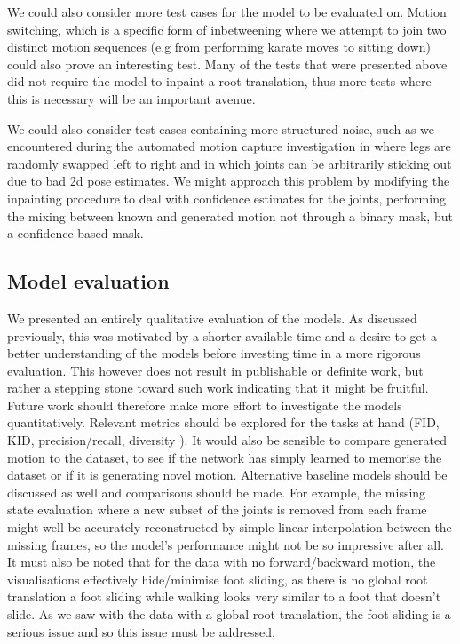We could also consider more test cases for the model to be evaluated on. Motion switching, which is a specific form of inbetweening where we attempt to join two distinct motion sequences (e.g from performing karate moves to sitting down) could also prove an interesting test. Many of the tests that were presented above did not require the model to inpaint a root translation, thus more tests where this is necessary will be an important avenue.

We could also consider test cases containing more structured noise, such as we encountered during the automated motion capture investigation in  where legs are randomly swapped left to right and in which joints can be arbitrarily sticking out due to bad 2d pose estimates. We might approach this problem by modifying the inpainting procedure to deal with confidence estimates for the joints, performing the mixing between known and generated motion not through a binary mask, but a confidence-based mask.

\subsection{Model evaluation}
\label{sec:future_work_evaluation}

We presented an entirely qualitative evaluation of the models. As discussed previously, this was motivated by a shorter available time and a desire to get a better understanding of the models before investing time in a more rigorous evaluation. This however does not result in publishable or definite work, but rather a stepping stone toward such work indicating that it might be fruitful. Future work should therefore make more effort to investigate the models quantitatively. Relevant metrics should be explored for the tasks at hand (FID, KID, precision/recall, diversity \cite{Paper_with_useful_metrics_cited_by_MDM}). It would also be sensible to compare generated motion to the dataset, to see if the network has simply learned to memorise the dataset or if it is generating novel motion. Alternative baseline models should be discussed as well and comparisons should be made. For example, the missing state evaluation where a new subset of the joints is removed from each frame might well be accurately reconstructed by simple linear interpolation between the missing frames, so the model's performance might not be so impressive after all. It must also be noted that for the data with no forward/backward motion, the visualisations effectively hide/minimise foot sliding, as there is no global root translation a foot sliding while walking looks very similar to a foot that doesn't slide. As we saw with the data with a global root translation, the foot sliding is a serious issue and so this issue must be addressed.


